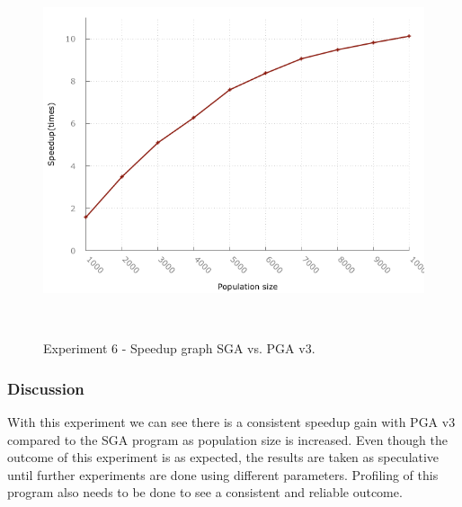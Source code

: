 \begin{figure}[H]
\begin{center}
  \includegraphics[width=.7 \linewidth]{stats_data_new/graphs/pga_partial_xPop_line.png}
  \caption{Experiment 6 - Speedup graph SGA vs. PGA v3.}
  \end{center}\
\end{figure}

\subsubsection{Discussion}
With this experiment we can see there is a consistent speedup gain with PGA v3 compared to the SGA program as population size is increased. Even though the outcome of this experiment is as expected, the results are taken as speculative until further experiments are done using different parameters. Profiling of this program also needs to be done to see a consistent and reliable outcome.
